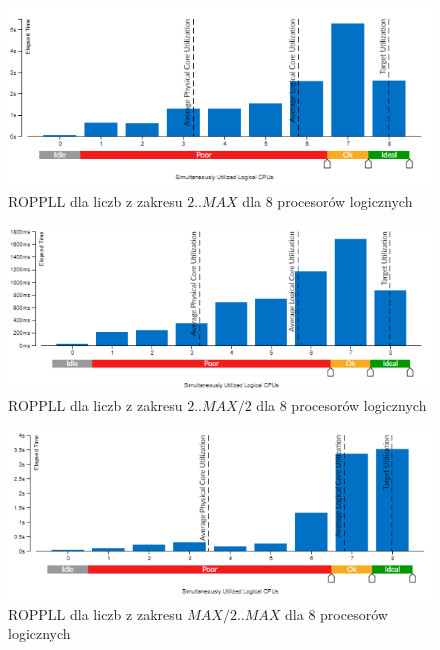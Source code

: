 \documentclass{article}
\begin{document}
                \begin{figure}[H]
                    \includegraphics[width=13cm]{rownolegly_funcion_bezsita8_2_MAX}
                    \caption{\gls{ROPPLL} dla liczb z zakresu $2 .. MAX$ dla 8 procesorów logicznych}
                \end{figure}
                \begin{figure}[H]
                    \includegraphics[width=13cm]{rownolegly_funcion_bezsita8_2_MAX2}
                    \caption{\gls{ROPPLL} dla liczb z zakresu $2 .. MAX / 2$ dla 8 procesorów logicznych}
                \end{figure}
                \begin{figure}[H]
                    \includegraphics[width=13cm]{rownolegly_funcion_bezsita8_MAX2_MAX}
                    \caption{\gls{ROPPLL} dla liczb z zakresu $MAX / 2 .. MAX$ dla 8 procesorów logicznych}
                \end{figure}
                
\end{document}
